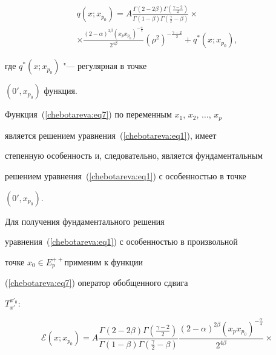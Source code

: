 \begin{multline}


\label{chebotareva:eq7} q\left( {x;  x_{p_0 } } \right) =


A\frac{\Gamma \left( {2 - 2\beta } \right)\Gamma \left(


{\frac{\gamma - 2}{2}} \right)}{\Gamma \left( {1 - \beta }


\right)\Gamma \left( {\frac{\gamma }{2} - \beta }


\right)}


\times\\ \times


\frac{\left( {2 - \alpha } \right)^{2\beta }\left( {x_p


x_{p_0 } } \right)^{ - \frac{\alpha }{4}}}{2^{4\beta }}\left(


{\rho ^2} \right)^{ - \frac{\gamma - 2}{2}} + q^\ast \left(


{x;  x_{p_0 } } \right), 


\end{multline}


где $q^\ast \left( {x; x_{p_0 } } \right)$ "--- регулярная в точке


$\left( {0', x_{p_0 }} \right)$ функция.


Функция~(\ref{chebotareva:eq7}) по переменным $x_1$,  $x_2$,  $\dots$,  $x_p$


является решением уравнения~(\ref{chebotareva:eq1}),  имеет


степенную особенность и,  следовательно,  является фундаментальным


решением уравнения~(\ref{chebotareva:eq1}) с особенностью в точке


$\left(0', x_{p_0}\right)$.





Для получения фундаментального решения


уравнения~(\ref{chebotareva:eq1}) с особенностью в произвольной


точке $x_0 \in E_p^{ + + } $применим к функции


(\ref{chebotareva:eq7}) оператор обобщенного сдвига


$T_{x'}^{{x}'_0 } $:





$$


\mathcal{E}\left( x; x_{p_0} \right) = A \frac{ \Gamma


\left(2-2\beta\right)\Gamma \left( \frac{\gamma-


2}{2}\right)}{\Gamma \left(1 - \beta\right)\Gamma


\left(\frac{\gamma}{2}-\beta\right)} \frac{\left(2 -


\alpha\right)^{2\beta}\left(x_p x_{p_0} \right)^{-


\frac{\alpha}{4}}}{2^{4\beta }} \times $$


